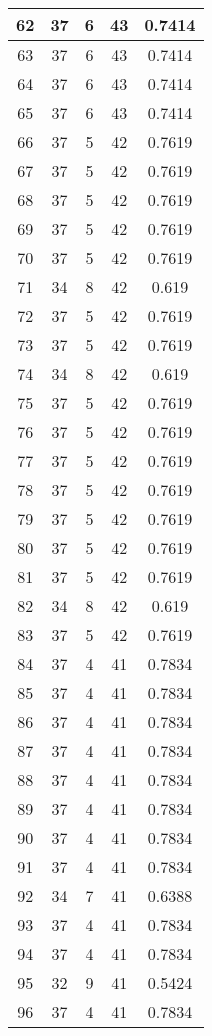 \documentclass[letterpaper, 12pt]{article}
\begin{document}
\begin{longtable}{|c|c|c|c|c|}
\hline
62 & 37 & 6 & 43 & 0.7414 \\
\hline
63 & 37 & 6 & 43 & 0.7414 \\
\hline
64 & 37 & 6 & 43 & 0.7414 \\
\hline
65 & 37 & 6 & 43 & 0.7414 \\
\hline
66 & 37 & 5 & 42 & 0.7619 \\
\hline
67 & 37 & 5 & 42 & 0.7619 \\
\hline
68 & 37 & 5 & 42 & 0.7619 \\
\hline
69 & 37 & 5 & 42 & 0.7619 \\
\hline
70 & 37 & 5 & 42 & 0.7619 \\
\hline
71 & 34 & 8 & 42 & 0.619 \\
\hline
72 & 37 & 5 & 42 & 0.7619 \\
\hline
73 & 37 & 5 & 42 & 0.7619 \\
\hline
74 & 34 & 8 & 42 & 0.619 \\
\hline
75 & 37 & 5 & 42 & 0.7619 \\
\hline
76 & 37 & 5 & 42 & 0.7619 \\
\hline
77 & 37 & 5 & 42 & 0.7619 \\
\hline
78 & 37 & 5 & 42 & 0.7619 \\
\hline
79 & 37 & 5 & 42 & 0.7619 \\
\hline
80 & 37 & 5 & 42 & 0.7619 \\
\hline
81 & 37 & 5 & 42 & 0.7619 \\
\hline
82 & 34 & 8 & 42 & 0.619 \\
\hline
83 & 37 & 5 & 42 & 0.7619 \\
\hline
84 & 37 & 4 & 41 & 0.7834 \\
\hline
85 & 37 & 4 & 41 & 0.7834 \\
\hline
86 & 37 & 4 & 41 & 0.7834 \\
\hline
87 & 37 & 4 & 41 & 0.7834 \\
\hline
88 & 37 & 4 & 41 & 0.7834 \\
\hline
89 & 37 & 4 & 41 & 0.7834 \\
\hline
90 & 37 & 4 & 41 & 0.7834 \\
\hline
91 & 37 & 4 & 41 & 0.7834 \\
\hline
92 & 34 & 7 & 41 & 0.6388 \\
\hline
93 & 37 & 4 & 41 & 0.7834 \\
\hline
94 & 37 & 4 & 41 & 0.7834 \\
\hline
95 & 32 & 9 & 41 & 0.5424 \\
\hline
96 & 37 & 4 & 41 & 0.7834 \\

\end{longtable}
\end{document}
